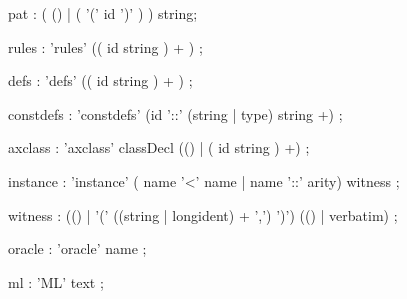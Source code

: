 \begin{rail}
pat : ( () | ( '(' id ')' ) ) string;

rules : 'rules' (( id string ) + )
      ;

defs : 'defs' (( id string ) + )
     ;

constdefs : 'constdefs' (id '::' (string | type) string +)
          ;

axclass : 'axclass' classDecl (() | ( id string ) +)
        ;

instance : 'instance' ( name '<' name | name '::' arity) witness
         ;

witness : (() | '(' ((string | longident) + ',') ')') (() | verbatim)
        ;

oracle : 'oracle' name
       ;

ml : 'ML' text
   ;

\end{rail}
